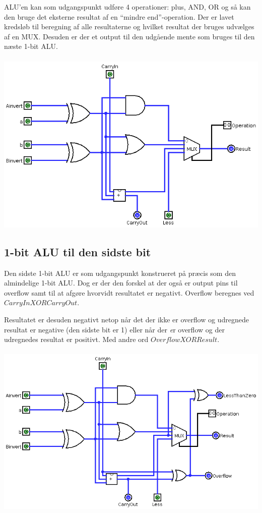 ALU'en kan som udgangspunkt udføre 4 operationer: plus, AND, OR og så kan den
bruge det eksterne resultat af en ``mindre end''-operation. Der er lavet
kredsløb til beregning af alle resultaterne og hvilket resultat der bruges
udvælges af en MUX. Desuden er der et output til den udgående mente som bruges
til den næste 1-bit ALU. \\
\\
\includegraphics[angle=90]{Billeder/1bit-ALU.png}

\subsection{1-bit ALU til den sidste bit}
Den sidste 1-bit ALU er som udgangspunkt konstrueret på præcis som den
almindelige 1-bit ALU. Dog er der den forskel at der også er output pins til
overflow samt til at afgøre hvorvidt resultatet er negativt. Overflow beregnes
ved $CarryIn XOR CarryOut$.

Resultatet er desuden negativt netop når det der ikke er overflow og udregnede
resultat er negative (den sidste bit er 1) eller når der {\emph er} overflow og
der udregnedes resultat er positivt. Med andre ord $Overflow XOR Result$. \\
\\
\includegraphics[angle=90]{Billeder/1bit-ALU-last.png}

